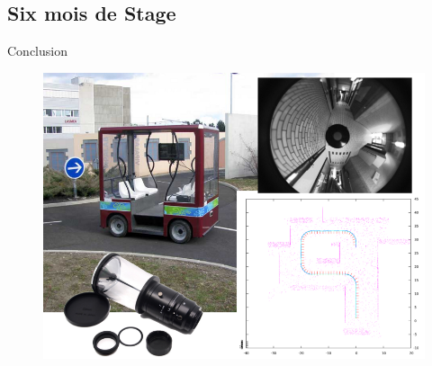 \documentclass{beamer}
\begin{document}
\subsection*{Six mois de Stage}
\begin{frame}{Conclusion}
  \begin{figure}
    \includegraphics[width=0.7\linewidth]{images/conclusion.png}
  \end{figure}
\end{frame}
\end{document}
